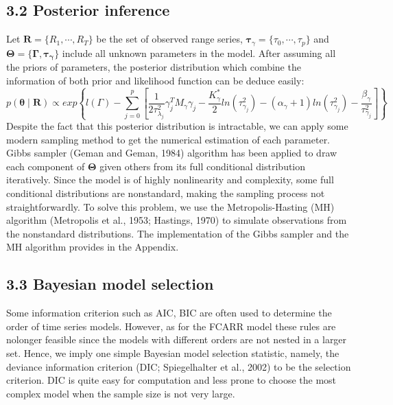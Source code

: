 \documentclass[
journal=jacsat, %
manuscript=article]{achemso}
\begin{document}
\begin{CJK*}{UTF8}{song}
\subsection{3.2 Posterior inference}
Let $\bm{R} = \{ R_1, \cdots, R_T\}$ be the set of observed range series, $\bm{\tau}_{\gamma} = \{\tau_0, \cdots, \tau_p\}$ and $\bm{\Theta} = \{ \bm{\Gamma}, \bm{\tau_{\gamma}}\}$ include all unknown parameters in the model. After assuming all the priors of parameters, the posterior distribution which combine the information of both prior and likelihood function can be deduce easily:
\begin{equation}
	p(\bm{\theta} \mid \bm{R}) \propto exp \left\{ l(\Gamma) - \sum_{j=0}^p[\frac{1}{2 \tau_{\lambda_j}^2}\gamma_j^T M_{\gamma} \gamma_j - \frac{K_{\gamma}^{*}}{2} ln(\tau_{\gamma_j}^2) - (\alpha_{\gamma} +1) ln(\tau_{\gamma_j}^2) - \frac{\beta_{\gamma}}{\tau_{\gamma_j}^2}] \right\}
\end{equation}
Despite the fact that this posterior distribution is intractable, we can apply some modern sampling method to get the numerical estimation of each parameter. Gibbs sampler (Geman and Geman, 1984) algorithm has been applied to draw each component of $\bm{\Theta}$ given others from its full conditional distribution iteratively. Since the model is of highly nonlinearity and complexity, some full conditional distributions are nonstandard, making the sampling process not straightforwardly. To solve this problem, we use the Metropolis-Hasting (MH) algorithm (Metropolis et al., 1953; Hastings, 1970) to simulate observations from the nonstandard distributions. The implementation of the Gibbs sampler and the MH algorithm provides in the Appendix.

\subsection{3.3 Bayesian model selection}
Some information criterion such as AIC, BIC are often used to determine the order of time series models. However, as for the FCARR model these rules are nolonger feasible since the models with different orders are not nested in a larger set. Hence, we imply one simple Bayesian model selection statistic, namely, the deviance information criterion (DIC; Spiegelhalter et al., 2002) to be the selection criterion. DIC is quite easy for computation and less prone to choose the most complex model when the sample size is not very large.


\end{CJK*}
\end{document}
